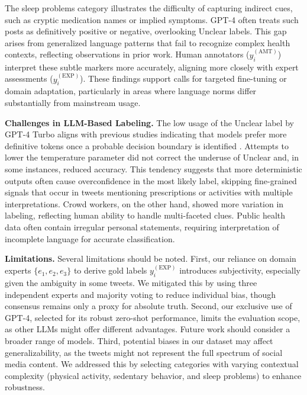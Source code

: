 \documentclass[letterpaper, 10 pt, conference]{ieeeconf} %
\begin{document}
The sleep problems category illustrates the difficulty of capturing indirect cues, such as cryptic medication names or implied symptoms. GPT-4 often treats such posts as definitively positive or negative, overlooking \textquotesingle{}Unclear\textquotesingle{} labels. This gap arises from generalized language patterns that fail to recognize complex health contexts, reflecting observations in prior work. Human annotators (\(y_i^{(\mathrm{AMT})}\)) interpret these subtle markers more accurately, aligning more closely with expert assessments (\(y_i^{(\mathrm{EXP})}\)). These findings support calls for targeted fine-tuning or domain adaptation, particularly in areas where language norms differ substantially from mainstream usage. 



{\bf Challenges in LLM-Based Labeling.} 
The low usage of the \textquotesingle{}Unclear\textquotesingle{} label by GPT-4 Turbo aligns with previous studies indicating that models prefer more definitive tokens once a probable decision boundary is identified \cite{zhong2024evaluation}. Attempts to lower the temperature parameter did not correct the underuse of \textquotesingle{}Unclear\textquotesingle{} and, in some instances, reduced accuracy. This tendency suggests that more deterministic outputs often cause overconfidence in the most likely label, skipping fine-grained signals that occur in tweets mentioning prescriptions or activities with multiple interpretations. Crowd workers, on the other hand, showed more variation in labeling, reflecting human ability to handle multi-faceted clues. Public health data often contain irregular personal statements, requiring interpretation of incomplete language for accurate classification.

{\bf Limitations.} 
Several limitations should be noted. First, our reliance on domain experts \(\{e_1, e_2, e_3\}\) to derive gold labels \(y_i^{(\mathrm{EXP})}\) introduces subjectivity, especially given the ambiguity in some tweets. We mitigated this by using three independent experts and majority voting to reduce individual bias, though consensus remains only a proxy for absolute truth. Second, our exclusive use of GPT-4, selected for its robust zero-shot performance, limits the evaluation scope, as other LLMs might offer different advantages. Future work should consider a broader range of models. Third, potential biases in our dataset may affect generalizability, as the tweets might not represent the full spectrum of social media content. We addressed this by selecting categories with varying contextual complexity (physical activity, sedentary behavior, and sleep problems) to enhance robustness.
\end{document}
